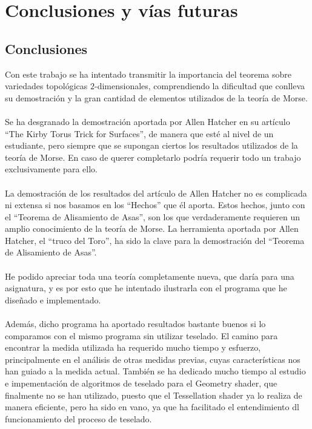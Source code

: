 %


\chapter*{Conclusiones y vías futuras}

\section*{Conclusiones}
Con este trabajo se ha intentado transmitir la importancia del teorema sobre variedades topológicas $2$-dimensionales, comprendiendo la dificultad que conlleva su demostración y la gran cantidad de elementos utilizados de la teoría de Morse.\\
\\Se ha desgranado la demostración aportada por Allen Hatcher en su artículo ``The Kirby Torus Trick for Surfaces'', de manera que esté al nivel de un estudiante, pero siempre que se supongan ciertos los resultados utilizados de la teoría de Morse. En caso de querer completarlo podría requerir todo un trabajo exclusivamente para ello.\\
\\La demostración de los resultados del artículo de Allen Hatcher no es complicada ni extensa si nos basamos en los ``Hechos'' que él aporta. Estos hechos, junto con el ``Teorema de Alisamiento de Asas'', son los que verdaderamente requieren un amplio conocimiento de la teoría de Morse. La herramienta aportada por Allen Hatcher, el ``truco del Toro'', ha sido la clave para la demostración del ``Teorema de Alisamiento de Asas''.\\
\\He podido apreciar toda una teoría completamente nueva, que daría para una asignatura, y es por esto que he intentado ilustrarla con el programa que he diseñado e implementado.\\
\\Además, dicho programa ha aportado resultados bastante buenos si lo comparamos con el mismo programa sin utilizar teselado. El camino para encontrar la medida utilizada ha requerido mucho tiempo y esfuerzo, principalmente en el análisis de otras medidas previas, cuyas características nos han guiado a la medida actual. También se ha dedicado mucho tiempo al estudio e impementación de algoritmos de teselado para el Geometry shader, que finalmente no se han utilizado, puesto que el Tessellation shader ya lo realiza de manera eficiente, pero ha sido en vano, ya que ha facilitado el entendimiento dl funcionamiento del proceso de teselado.\\
